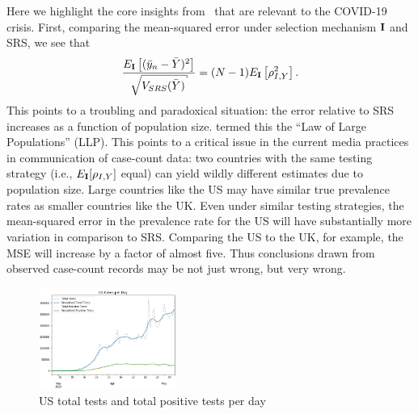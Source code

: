 \documentclass[aoas]{amsart}
\def\I{\bf I}
\begin{document}
Here we highlight the core insights from~\cite{Meng2018} that are relevant to the COVID-19 crisis.  First, comparing the mean-squared error under selection mechanism $\I$ and SRS, we see that
$$
\frac{E_{\I} \left[ (\bar y_n - \bar Y)^2 \right]}{\sqrt{V_{SRS} (\bar Y)}} = (N-1) E_{\I} \left[ \rho_{I,Y}^2 \right].
$$
This points to a troubling and paradoxical situation: the error relative to SRS increases as a function of population size.  \cite{Meng2018} termed this the ``Law of Large Populations'' (LLP).  This points to a critical issue in the current media practices in communication of case-count data: two countries with the same testing strategy (i.e., $E_{\I} [\rho_{I,Y} ]$ equal) can yield wildly different estimates due to population size.  Large countries like the US may have similar true prevalence rates as smaller countries like the UK.  Even under similar testing strategies, the mean-squared error in the prevalence rate for the US will have substantially more variation in comparison to SRS.  Comparing the US to the UK, for example, the MSE will increase by a factor of almost five.  Thus conclusions drawn from observed case-count records may be not just wrong, but very wrong.

\begin{figure}
\centering
\includegraphics[width = 0.4\textwidth]{../methods/figs/US-casecount.png}
\caption{US total tests and total positive tests per day}
\label{fig:ustests}
\vspace{-0.3cm}
\end{figure}
\end{document}
